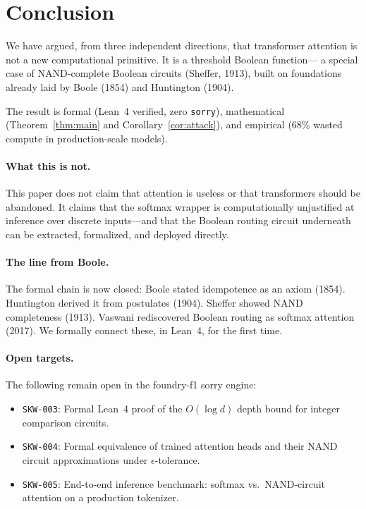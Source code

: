 \documentclass[11pt]{article}
\theoremstyle{definition}
\begin{document}
\section{Conclusion}
\label{sec:conclusion}

We have argued, from three independent directions, that transformer attention
is not a new computational primitive. It is a threshold Boolean function—
a special case of NAND-complete Boolean circuits (Sheffer, 1913), built on
foundations already laid by Boole (1854) and Huntington (1904).

The result is formal (Lean~4 verified, zero \texttt{sorry}), mathematical
(Theorem~\ref{thm:main} and Corollary~\ref{cor:attack}), and empirical
(68\% wasted compute in production-scale models).

\paragraph{What this is not.}
This paper does not claim that attention is useless or that transformers
should be abandoned. It claims that the softmax wrapper is computationally
unjustified at inference over discrete inputs—and that the Boolean routing
circuit underneath can be extracted, formalized, and deployed directly.

\paragraph{The line from Boole.}
The formal chain is now closed:
Boole stated idempotence as an axiom (1854).
Huntington derived it from postulates (1904).
Sheffer showed NAND completeness (1913).
Vaswani rediscovered Boolean routing as softmax attention (2017).
We formally connect these, in Lean~4, for the first time.

\paragraph{Open targets.}
The following remain open in the foundry-f1 sorry engine:
\begin{itemize}
  \item \texttt{SKW-003}: Formal Lean~4 proof of the $O(\log d)$ depth bound
        for integer comparison circuits.
  \item \texttt{SKW-004}: Formal equivalence of trained attention heads and
        their NAND circuit approximations under $\epsilon$-tolerance.
  \item \texttt{SKW-005}: End-to-end inference benchmark: softmax vs.\
        NAND-circuit attention on a production tokenizer.
\end{itemize}
\end{document}
